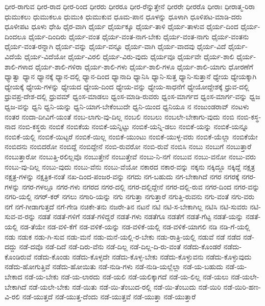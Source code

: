 {ಧೀರ-ರಾಗುವ
ಧೀರ-ರಾದ
ಧೀರ-ರಿಂದ
ಧೀರರು
ಧೀರರೂ
ಧೀರ-ರೆನ್ನುತ್ತೇನೆ
ಧೀರರೇ
ಧೀರರೊ
ಧೀರಾಃ
ಧೀರಾತ್ಮ-ರಿರಾ
ಧುಮುಕಲು
ಧುಮುಕಲೂ
ಧುಮುಕಿ
ಧುಮುಕುವ
ಧೂಮ-ಪಾನ
ಧೂಳನ್ನು
ಧೂಳಾಗಿ
ಧೂಳಿಪಟ-ಮಾಡಿ-ದರು
ಧೂಳೀಪಟ
ಧೂಳು
ಧೇಹಿ
ಧೈರ-ವಾಗಿ
ಧೈರ್ಯ
ಧೈರ್ಯಕ್ಕೂ
ಧೈರ್ಯ-ತಾಳಿ
ಧೈರ್ಯ-ತಾಳುವ
ಧೈರ್ಯ-ದಿಂದ
ಧೈರ್ಯ-ದಿಂದಲೂ
ಧೈರ್ಯ-ದಿಂದಿರು
ಧೈರ್ಯ-ವಂತ
ಧೈರ್ಯ-ವಂತ-ನಾಗ-ಬೇಕು
ಧೈರ್ಯ-ವಂತ-ನಾಗು
ಧೈರ್ಯ-ವಂತನು
ಧೈರ್ಯ-ವಂತ-ರನ್ನಾಗಿ
ಧೈರ್ಯ-ವನ್ನು
ಧೈರ್ಯ-ವನ್ನೂ
ಧೈರ್ಯ-ವಾಗಿ
ಧೈರ್ಯ-ವಾದವು
ಧೈರ್ಯ-ವಿದೆ
ಧೈರ್ಯ-ವಿದೆಯೆ
ಧೈರ್ಯ-ವಿದೆಯೋ
ಧೈರ್ಯ-ವಿರಲಿ
ಧೈರ್ಯ-ವಿರು-ವುದು
ಧೈರ್ಯವೂ
ಧೈರ್ಯವೇ
ಧೈರ್ಯ-ಶಾಲಿ
ಧೈರ್ಯ-ಶಾಲಿ-ಗಳಾದ
ಧೈರ್ಯ-ಶಾಲಿ-ಗಳಿರಾ
ಧೈರ್ಯ-ಶಾಲಿ-ಗಳು
ಧೈರ್ಯ-ಶಾಲಿ-ಗಳೂ
ಧೈರ್ಯ-ಶಾಲಿ-ಯಾಗು
ಧೋರಣೆಗೆ
ಧ್ಯಾತ್ವಾ
ಧ್ಯಾನ
ಧ್ಯಾನಕ್ಕೆ
ಧ್ಯಾನ-ದಲ್ಲಿ
ಧ್ಯಾನ-ದಿಂದ
ಧ್ಯಾನಾದಿ
ಧ್ಯಾನಿಸಿ
ಧ್ಯಾನಿ-ಸುತ್ತ
ಧ್ಯಾನಿ-ಸುತ್ತಾನೆ
ಧ್ಯೇಯ
ಧ್ಯೇಯಕ್ಕಾಗಿ
ಧ್ಯೇಯಕ್ಕೆ
ಧ್ಯೇಯ-ಗಳನ್ನು
ಧ್ಯೇಯದ
ಧ್ಯೇಯ-ದಿಂದ
ಧ್ಯೇಯ-ವನ್ನು
ಧ್ಯೇಯ-ಸಾಧನೆಗೆ
ಧ್ಯೇಯೋದ್ದೇಶಕ್ಕೆ
ಧ್ರುವ-ದಲ್ಲಿ
ಧ್ರುವಪ್ರ-ದೇಶ-ದಲ್ಲಿ
ಧ್ರುವಮ್
ಧ್ವಂಸ-ಮಾಡಲು
ಧ್ವಂಸ-ಮಾಡಿ-ರುವರು
ಧ್ವಂಸ-ಮಾರ್ಗದ
ಧ್ವಂಸ-ಮಾರ್ಗ-ವನ್ನು
ಧ್ವಜ
ಧ್ವಜ-ವನ್ನು
ಧ್ವನಿ
ಧ್ವನಿ-ಯನ್ನು
ಧ್ವನಿ-ಯಾಗ-ಬೇಕೆಂಬುದೇ
ಧ್ವನಿ-ಯಿಂದ
ಧ್ವನಿಯೂ
ನ
ನಂಜುಂಡರಾವ್
ನಂಟಳು
ನಂತರ
ನಂದಾ-ದೀವಿಗೆ-ಯಂತೆ
ನಂಬ-ಲಾಗು-ವು-ದಿಲ್ಲ
ನಂಬಲಿ
ನಂಬಲು
ನಂಬಲೇ-ಬೇಕಾಗು-ವುದು
ನಂಬಿ
ನಂಬಿ-ಕಸ್ಥ-ನಾದ
ನಂಬಿ-ಕಸ್ಥರು
ನಂಬಿಕೆ
ನಂಬಿಕೆಯ
ನಂಬಿಕೆ-ಯನ್ನಿಟ್ಟು
ನಂಬಿಕೆ-ಯನ್ನಿ-ಡಲು
ನಂಬಿಕೆ-ಯನ್ನು
ನಂಬಿಕೆ-ಯನ್ನೂ
ನಂಬಿಕೆ-ಯಲ್ಲಿ
ನಂಬಿಕೆ-ಯಿಟ್ಟರೆ
ನಂಬಿಕೆ-ಯಿಲ್ಲ
ನಂಬಿಕೆ-ಯುಂಟು
ನಂಬಿಕೆ-ಯುಳ್ಳ-ವರು
ನಂಬಿಕೆ-ಯೆಲ್ಲಾ
ನಂಬಿಕೆಯೇ
ನಂಬಿದನು
ನಂಬಿದರೋ
ನಂಬಿದ್ದೆ
ನಂಬಿದ್ದೇನೆ
ನಂಬಿ-ರುವರೋ
ನಂಬಿ-ರುವೆ
ನಂಬಿಸಿ
ನಂಬು
ನಂಬುಗೆ
ನಂಬುತ್ತಾರೆ
ನಂಬುತ್ತಾರೋ
ನಂಬುತ್ತಿ-ರಲಿಲ್ಲವೊ
ನಂಬುತ್ತೇನೆ
ನಂಬುತ್ತೇವೆ
ನಂಬು-ನಿ-ನಗೆ
ನಂಬುವ
ನಂಬು-ವನೋ
ನಂಬು-ವರು
ನಂಬು-ವು-ದಿಲ್ಲ
ನಂಬು-ವುದು
ನಂಬು-ವೆನು
ನಂಬು-ವೆಯೋ
ನಕಾರದ
ನಕಾರ-ವನ್ನು
ನಕ್ಕನು
ನಕ್ಕಿದ್ದೂ
ನಕ್ಕಿದ್ದೆ
ನಕ್ಷತ್ರ
ನಕ್ಷತ್ರ-ಗಳನ್ನು
ನಕ್ಷತ್ರಿಕ-ನಂತೆ
ನಖ-ದಿಂದ-ಪಂಜರ-ವನ್ನು
ನಗದು
ನಗ-ಬಹುದು
ನಗ-ಬೇಕಾಗಿದೆ
ನಗರ
ನಗರಕ್ಕೆ
ನಗರ-ಗಳನ್ನು
ನಗರ-ಗಳಲ್ಲೂ
ನಗರ-ಗಳು
ನಗರದ
ನಗರ-ದಲ್ಲಿ
ನಗರ-ದಲ್ಲಿದ್ದೇನೆ
ನಗರ-ದಲ್ಲಿ-ರುವ
ನಗರ-ದಿಂದ
ನಗರ-ವನ್ನು
ನಗರಿ-ಯಲ್ಲಿ
ನಗರ್‌-ಕರ್‌
ನಗಲು
ನಗಾರಿ-ಯನ್ನು
ನಗು
ನಗುತ್ತಾ
ನಗುತ್ತಾರೆ
ನಗುತ್ತಿ-ರುವನು
ನಗು-ವಂತೆ
ನಗು-ವರು
ನಗೆ
ನಗೆ-ಗೀಡಾಗುತ್ತದೆ
ನಗೆ-ಗೇಡಿ
ನಚಿಕೇ-ತನು
ನಜರೇ-ತಿನ
ನಟನೆ
ನಟಿ
ನಟಿ-ಸ-ಬೇಕಾಗಿಲ್ಲ
ನಟಿಸಿ
ನಟಿ-ಸುವರು
ನಟಿ-ಸುವ-ವ-ರನ್ನು
ನಡತೆ
ನಡತೆ-ಗಳಿಗೆ
ನಡತೆ-ಗಳಿದ್ದರೆ
ನಡತೆ-ಗಳು
ನಡತೆಗೂ
ನಡತೆಗೆ
ನಡತೆ-ಗೆಟ್ಟ
ನಡತೆ-ಯನ್ನು
ನಡತೆ-ಯಲ್ಲಿ
ನಡ-ತೆಯೇ
ನಡ-ವಳಿ-ಕೆಗೆ
ನಡ-ವಳಿಕೆ-ಯನ್ನು
ನಡ-ವಳಿಕೆ-ಯಲ್ಲಿ
ನಡ-ವಳಿಕೆ-ಯಾಗಲಿ
ನಡಿ
ನಡಿ-ಗೆ-ಯಲ್ಲಿ
ನಡು
ನಡುಕ
ನಡು-ಗಿ-ಸುವ
ನಡು-ಮನೆ
ನಡು-ಮನೆ-ಯಲ್ಲಿ-ರ-ಬೇಕು
ನಡು-ರಾತ್ರಿ-ಯಲ್ಲಿ
ನಡುವೆ
ನಡೆ
ನಡೆದ
ನಡೆ-ದದ್ದು
ನಡೆ-ದವೊ
ನಡೆ-ದಿದೆ
ನಡೆ-ದಿರು-ವೆನು
ನಡೆ-ದಿಲ್ಲ
ನಡೆ-ದಿಲ್ಲ-ದಿ-ರು-ವಂತೆ
ನಡೆದು-ಕೊಂಡರೆ
ನಡೆದು-ಕೊಂಡಿರುವೆ
ನಡೆದು-ಕೊಂಡು
ನಡೆದು-ಕೊಳ್ಳದೇ
ನಡೆದು-ಕೊಳ್ಳ-ಬೇಕು
ನಡೆದು-ಕೊಳ್ಳುವನು
ನಡೆದು-ಕೊಳ್ಳುವುದು
ನಡೆದು-ಹೋಗುತ್ತಿವೆ
ನಡೆದು-ಹೋಯಿತು
ನಡೆ-ನುಡಿ-ಗಳು
ನಡೆ-ನುಡಿ-ಯಲ್ಲೆಲ್ಲಾ
ನಡೆ-ಯ-ಬಹುದು
ನಡೆ-ಯ-ಬೇಕಾದ
ನಡೆ-ಯ-ಬೇಕು
ನಡೆ-ಯ-ಲಾರದು
ನಡೆ-ಯಲಿ
ನಡೆ-ಯಲಿಕ್ಕಾಗದೆ
ನಡೆ-ಯ-ಲಿಲ್ಲ
ನಡೆ-ಯಲು
ನಡೆ-ಯಲೇ-ಬೇಕಾಗಿದೆ
ನಡೆ-ಯಲೇ-ಬೇಕು
ನಡೆ-ಯಿತು
ನಡೆ-ಯಿ-ತೆಂಬುದ-ರಲ್ಲಿ
ನಡೆ-ಯಿ-ತೆಂಬುದು
ನಡೆ-ಯಿರಿ
ನಡೆ-ಯಿರಿ-ಹಣ-ವಿ-ರಲಿ
ನಡೆ-ಯುತ್ತದೆ
ನಡೆ-ಯುತ್ತ-ದೆಂದು
ನಡೆ-ಯುತ್ತವೆ
ನಡೆ-ಯುತ್ತಾ
ನಡೆ-ಯುತ್ತಾರೆ
}
